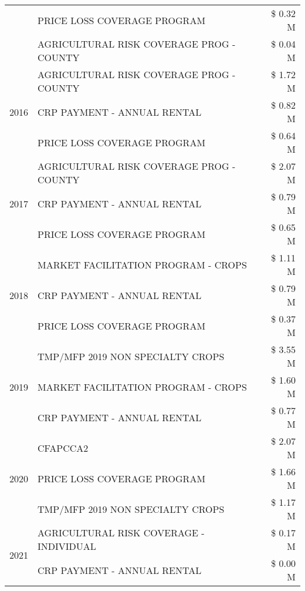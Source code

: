\begin{tabular}{llr}
 & PRICE LOSS COVERAGE PROGRAM & \$ 0.32 M \\
 & AGRICULTURAL RISK COVERAGE PROG - COUNTY & \$ 0.04 M \\
\cline{1-3}
\multirow[t]{3}{*}{2016} & AGRICULTURAL RISK COVERAGE PROG - COUNTY & \$ 1.72 M \\
 & CRP PAYMENT - ANNUAL RENTAL & \$ 0.82 M \\
 & PRICE LOSS COVERAGE PROGRAM & \$ 0.64 M \\
\cline{1-3}
\multirow[t]{3}{*}{2017} & AGRICULTURAL RISK COVERAGE PROG - COUNTY & \$ 2.07 M \\
 & CRP PAYMENT - ANNUAL RENTAL & \$ 0.79 M \\
 & PRICE LOSS COVERAGE PROGRAM & \$ 0.65 M \\
\cline{1-3}
\multirow[t]{3}{*}{2018} & MARKET FACILITATION PROGRAM - CROPS & \$ 1.11 M \\
 & CRP PAYMENT - ANNUAL RENTAL & \$ 0.79 M \\
 & PRICE LOSS COVERAGE PROGRAM & \$ 0.37 M \\
\cline{1-3}
\multirow[t]{3}{*}{2019} & TMP/MFP 2019 NON SPECIALTY CROPS & \$ 3.55 M \\
 & MARKET FACILITATION PROGRAM - CROPS & \$ 1.60 M \\
 & CRP PAYMENT - ANNUAL RENTAL & \$ 0.77 M \\
\cline{1-3}
\multirow[t]{3}{*}{2020} & CFAPCCA2 & \$ 2.07 M \\
 & PRICE LOSS COVERAGE PROGRAM & \$ 1.66 M \\
 & TMP/MFP 2019 NON SPECIALTY CROPS & \$ 1.17 M \\
\cline{1-3}
\multirow[t]{2}{*}{2021} & AGRICULTURAL RISK COVERAGE - INDIVIDUAL & \$ 0.17 M \\
 & CRP PAYMENT - ANNUAL RENTAL & \$ 0.00 M \\
\cline{1-3}
\bottomrule
\end{tabular}
